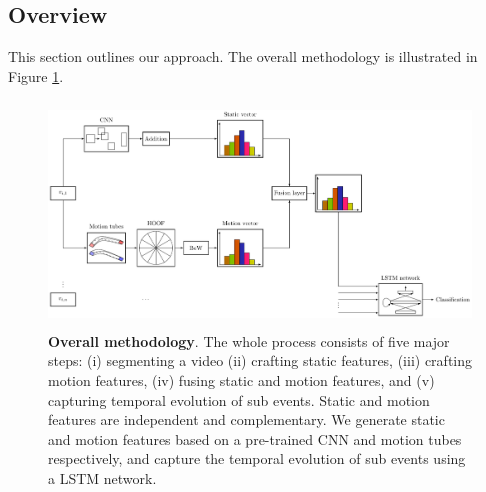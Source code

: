 
\subsection{Overview}

This section outlines our approach. The overall methodology is illustrated in Figure \ref{fi:test}.



\begin{figure}
  \centering
  \includegraphics[width=18cm, height=6cm]{overall.pdf}
  \caption{\textbf{Overall methodology}. The whole process consists of five major steps: (i) segmenting a video (ii) crafting static features, (iii) crafting motion features,
  (iv) fusing static and motion features, and (v) capturing temporal evolution of sub events. Static and motion features are independent
  and complementary. We generate static and motion features based on a pre-trained CNN and
  motion tubes respectively, and capture the temporal evolution of sub events using a LSTM network.}

 \label{fi:test}
\end{figure}



